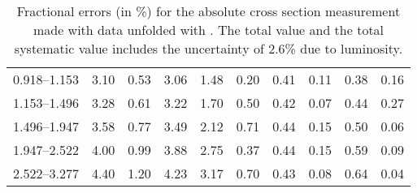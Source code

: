 \begin{table}
\begin{center}
\begin{tabular}{@{}l l l l l l l l l l@{}}
            0.918--1.153     &  3.10   &  0.53   &  3.06         &  1.48      &  0.20    &  0.41  &  0.11       &  0.38  &  0.16  \\
            1.153--1.496     &  3.28   &  0.61   &  3.22         &  1.70      &  0.50    &  0.42  &  0.07       &  0.44  &  0.27  \\
            1.496--1.947     &  3.58   &  0.77   &  3.49         &  2.12      &  0.71    &  0.44  &  0.15       &  0.50  &  0.06  \\
            1.947--2.522     &  4.00   &  0.99   &  3.88         &  2.75      &  0.37    &  0.44  &  0.15       &  0.59  &  0.09  \\
            2.522--3.277     &  4.40   &  1.20   &  4.23         &  3.17      &  0.70    &  0.43  &  0.08       &  0.64  &  0.04  \\
            \bottomrule
        \end{tabular}
    \end{center}
    \caption[
        Fractional errors (in \%) for the absolute cross section measurement
        made with data unfolded with \POWHEG.
    ]{
        Fractional errors (in \%) for the absolute cross section measurement
        made with data unfolded with \POWHEG. The total value and the total
        systematic value includes the uncertainty of 2.6\% due to luminosity.
    }
    \label{tab:sys_uncert_abs_powheg}
\end{table}

